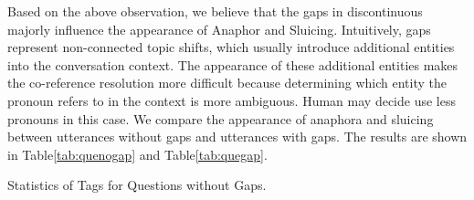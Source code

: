 \documentclass[bsc,frontabs,twoside,singlespacing,parskip,deptreport]{infthesis}     %
\begin{document}
Based on the above observation, we believe that the gaps in discontinuous majorly influence the appearance of Anaphor and Sluicing. Intuitively, gaps represent non-connected topic shifts, which usually introduce additional entities into the conversation context. The appearance of these additional entities makes the co-reference resolution more difficult because determining which entity the pronoun refers to in the context is more ambiguous. Human may decide use less pronouns in this case. We compare the appearance of anaphora and sluicing between utterances without gaps and utterances with gaps. The results are shown in Table\ref{tab:quenogap} and Table\ref{tab:quegap}.


\begin{minipage}{\textwidth}


        \begin{minipage}[t]{0.45\textwidth}
            \centering
            \makeatletter{}\makeatother


\caption{Statistics of Tags for Questions without Gaps.}
\label{tab:quenogap}




\end{minipage}
\end{minipage}
\end{document}
